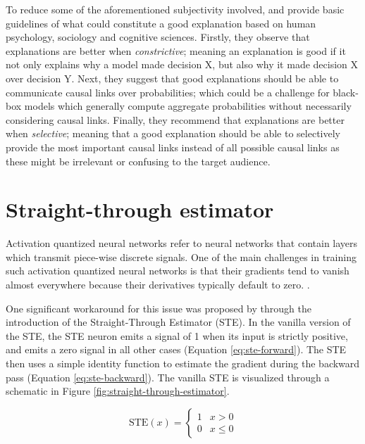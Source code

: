 To reduce some of the aforementioned subjectivity involved, \citet{MILLER20191} and \citet{arrieta2020explainable}  provide basic guidelines of what could constitute a good explanation based on human psychology, sociology and cognitive sciences. Firstly, they observe that explanations are better when \textit{constrictive}; meaning an explanation is good if it not only explains why a model made decision X, but also why it made decision X over decision Y. Next, they suggest that good explanations should be able to communicate causal links over probabilities; which could be a challenge for black-box models which generally compute aggregate probabilities without necessarily considering causal links. Finally, they recommend that explanations are better when \textit{selective}; meaning that a good explanation should be able to selectively provide the most important causal links instead of all possible causal links as these might be irrelevant or confusing to the target audience.

\section{Straight-through estimator}

Activation quantized neural networks refer to neural networks that contain layers which transmit piece-wise discrete signals. One of the main challenges in training such activation quantized neural networks is that their gradients tend to vanish almost everywhere because their derivatives typically default to zero. \citep{bengio2013estimating,courbariaux2016binarized,yin2019understanding}.

One significant workaround for this issue was proposed by \citet{bengio2013estimating} through the introduction of the Straight-Through Estimator (STE). In the vanilla version of the STE, the STE neuron emits a signal of 1 when its input is strictly positive, and emits a zero signal in all other cases (Equation \ref{eq:ste-forward}). The STE then uses a simple identity function to estimate the gradient during the backward pass (Equation \ref{eq:ste-backward}). The vanilla STE is visualized through a schematic in Figure \ref{fig:straight-through-estimator}.

\begin{equation}
  \label{eq:ste-forward}
  \text{STE}(x)=
  \begin{cases}
    1 & x > 0 \\
    0 & x \leq 0
  \end{cases}
\end{equation}


